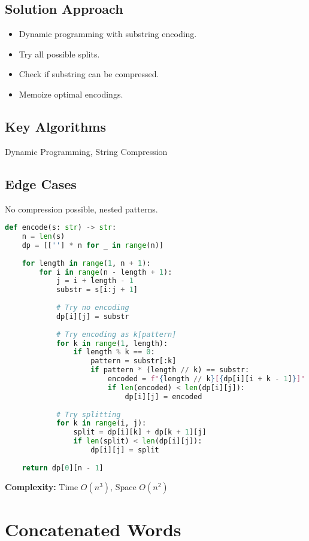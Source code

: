 \documentclass[10pt, a4paper]{article}
\begin{document}
\subsection*{Solution Approach}
\begin{itemize}
    \item Dynamic programming with substring encoding.
    \item Try all possible splits.
    \item Check if substring can be compressed.
    \item Memoize optimal encodings.
\end{itemize}

\subsection*{Key Algorithms}
Dynamic Programming, String Compression

\subsection*{Edge Cases}
No compression possible, nested patterns.

\begin{lstlisting}[language=Python]
def encode(s: str) -> str:
    n = len(s)
    dp = [[''] * n for _ in range(n)]
    
    for length in range(1, n + 1):
        for i in range(n - length + 1):
            j = i + length - 1
            substr = s[i:j + 1]
            
            # Try no encoding
            dp[i][j] = substr
            
            # Try encoding as k[pattern]
            for k in range(1, length):
                if length % k == 0:
                    pattern = substr[:k]
                    if pattern * (length // k) == substr:
                        encoded = f"{length // k}[{dp[i][i + k - 1]}]"
                        if len(encoded) < len(dp[i][j]):
                            dp[i][j] = encoded
            
            # Try splitting
            for k in range(i, j):
                split = dp[i][k] + dp[k + 1][j]
                if len(split) < len(dp[i][j]):
                    dp[i][j] = split
    
    return dp[0][n - 1]
\end{lstlisting}
\textbf{Complexity:} Time $O(n^3)$, Space $O(n^2)$

\section{Concatenated Words}
\end{document}
